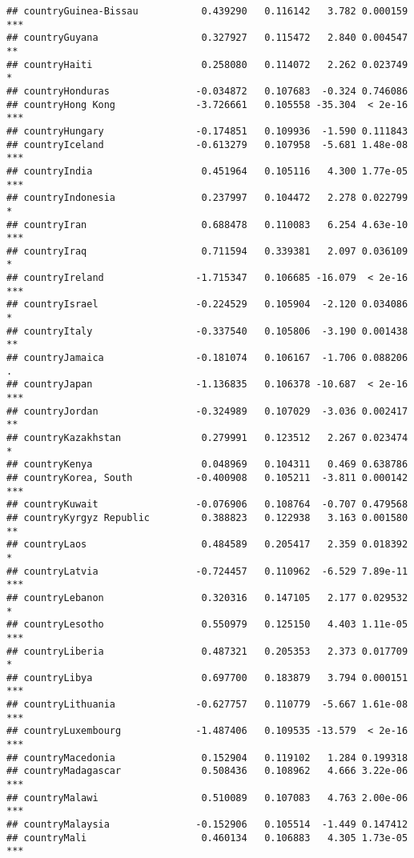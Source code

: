 \documentclass[
  11pt,
]{article}
\begin{document}
\begin{verbatim}
## countryGuinea-Bissau           0.439290   0.116142   3.782 0.000159 ***
## countryGuyana                  0.327927   0.115472   2.840 0.004547 ** 
## countryHaiti                   0.258080   0.114072   2.262 0.023749 *  
## countryHonduras               -0.034872   0.107683  -0.324 0.746086    
## countryHong Kong              -3.726661   0.105558 -35.304  < 2e-16 ***
## countryHungary                -0.174851   0.109936  -1.590 0.111843    
## countryIceland                -0.613279   0.107958  -5.681 1.48e-08 ***
## countryIndia                   0.451964   0.105116   4.300 1.77e-05 ***
## countryIndonesia               0.237997   0.104472   2.278 0.022799 *  
## countryIran                    0.688478   0.110083   6.254 4.63e-10 ***
## countryIraq                    0.711594   0.339381   2.097 0.036109 *  
## countryIreland                -1.715347   0.106685 -16.079  < 2e-16 ***
## countryIsrael                 -0.224529   0.105904  -2.120 0.034086 *  
## countryItaly                  -0.337540   0.105806  -3.190 0.001438 ** 
## countryJamaica                -0.181074   0.106167  -1.706 0.088206 .  
## countryJapan                  -1.136835   0.106378 -10.687  < 2e-16 ***
## countryJordan                 -0.324989   0.107029  -3.036 0.002417 ** 
## countryKazakhstan              0.279991   0.123512   2.267 0.023474 *  
## countryKenya                   0.048969   0.104311   0.469 0.638786    
## countryKorea, South           -0.400908   0.105211  -3.811 0.000142 ***
## countryKuwait                 -0.076906   0.108764  -0.707 0.479568    
## countryKyrgyz Republic         0.388823   0.122938   3.163 0.001580 ** 
## countryLaos                    0.484589   0.205417   2.359 0.018392 *  
## countryLatvia                 -0.724457   0.110962  -6.529 7.89e-11 ***
## countryLebanon                 0.320316   0.147105   2.177 0.029532 *  
## countryLesotho                 0.550979   0.125150   4.403 1.11e-05 ***
## countryLiberia                 0.487321   0.205353   2.373 0.017709 *  
## countryLibya                   0.697700   0.183879   3.794 0.000151 ***
## countryLithuania              -0.627757   0.110779  -5.667 1.61e-08 ***
## countryLuxembourg             -1.487406   0.109535 -13.579  < 2e-16 ***
## countryMacedonia               0.152904   0.119102   1.284 0.199318    
## countryMadagascar              0.508436   0.108962   4.666 3.22e-06 ***
## countryMalawi                  0.510089   0.107083   4.763 2.00e-06 ***
## countryMalaysia               -0.152906   0.105514  -1.449 0.147412    
## countryMali                    0.460134   0.106883   4.305 1.73e-05 ***

\end{verbatim}
\end{document}
